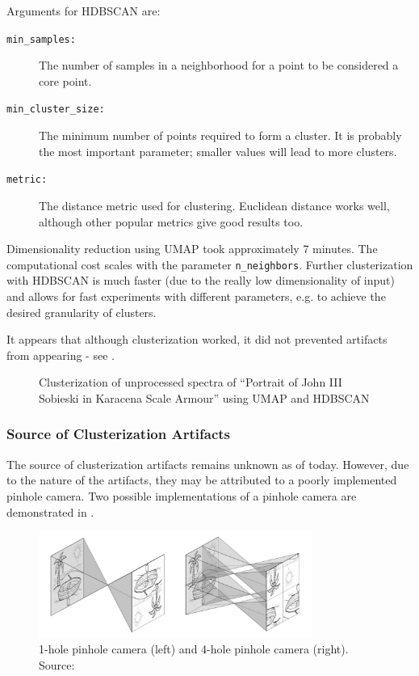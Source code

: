 Arguments for HDBSCAN are:
\begin{description}
    \item[\texttt{min\_samples:}] The number of samples in a neighborhood for a point to be considered a core point.
    \item[\texttt{min\_cluster\_size:}] The minimum number of points required to form a cluster. It is probably the most important parameter; smaller values will lead to more clusters.
    \item[\texttt{metric:}] The distance metric used for clustering. Euclidean distance works well, although other popular metrics give good results too.
\end{description}

Dimensionality reduction using UMAP took approximately 7 minutes. 
The computational cost scales with the parameter \texttt{n\_neighbors}.
Further clusterization with HDBSCAN is much faster (due to the really low dimensionality of input) and allows for fast experiments with different parameters, e.g. to achieve the desired granularity of clusters.

It appears that although clusterization worked, it did not prevented artifacts from appearing - see .
\begin{figure}[H] 
  \centering     
   
  \caption{Clusterization of unprocessed spectra of ``Portrait of John III Sobieski in Karacena Scale Armour'' using UMAP and HDBSCAN}
  \label{fig:sobieski_clustered_hdbscan_noise}
\end{figure}

\newpage
\subsubsection{Source of Clusterization Artifacts}
\label{sec:pinhole-camera}
The source of clusterization artifacts remains unknown as of today. 
However, due to the nature of the artifacts, they may be attributed to a poorly implemented pinhole camera.
Two possible implementations of a pinhole camera are demonstrated in .

\begin{figure}[H]
  \centering
  \includegraphics[width=0.8\textwidth]{img/pinhole_camera.png}
  \caption{1-hole pinhole camera (left) and 4-hole pinhole camera (right). Source: \cite{Lach2022}}
  \label{fig:pinhole-camera-implementations}
\end{figure}

